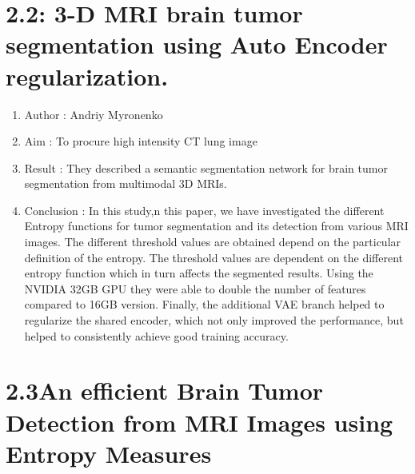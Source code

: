 \documentclass[oneside,a4paper,12pt]{book}
\begin{document}
\newpage

\vspace{\baselineskip}\section*{2.2\hspace*{10pt}: 3-D MRI brain tumor segmentation using Auto Encoder regularization.  }
\begin{enumerate}
\item Author : Andriy Myronenko

\item Aim : To procure high intensity CT lung image
\item Result : They described a semantic segmentation network for brain tumor segmentation from multimodal 3D MRIs. 
\item Conclusion : In this study,n this paper, we have investigated the different Entropy functions for tumor segmentation and its detection from various MRI images. The different threshold values are obtained depend on the particular definition of the entropy. The threshold values are dependent on the different entropy function which in turn affects the segmented results.
Using the NVIDIA 32GB GPU they were able to double the number of features compared to 16GB version. Finally, the additional VAE branch helped to regularize the shared encoder, which not only improved the performance, but helped to consistently achieve good training accuracy.

\end{enumerate}
\par
\newpage
\vspace{\baselineskip}\section*{2.3\hspace*{10pt}An efficient Brain Tumor Detection from MRI Images using Entropy Measures }
\end{document}
